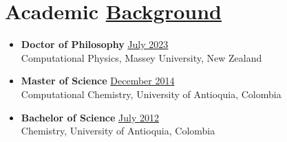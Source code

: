 \section{Academic \href{.}{Background}}

\begin{itemize}
    \itemsep-1mm
    \item {\bf Doctor of Philosophy}\hfill
          \href{.}{July 2023}\\
          Computational Physics, Massey University, New Zealand
    \item {\bf Master of Science}\hfill
          \href{.}{December 2014}\\
          Computational Chemistry, University of Antioquia, Colombia
    \item {\bf Bachelor of Science}\hfill
          \href{.}{July 2012}\\
          Chemistry, University of Antioquia, Colombia
\end{itemize}